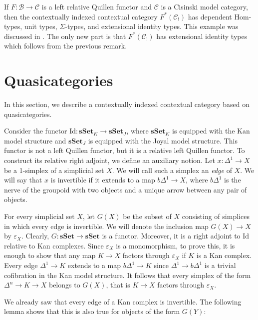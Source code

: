 \documentclass[reqno]{amsart}
\theoremstyle{definition}
\theoremstyle{remark}
\newcommand{\bDelta}{b \Delta}
\newcommand{\fs}[1]{\mathrm{#1}}
\newcommand{\cat}[1]{\mathbf{#1}}
\newcommand{\scat}[1]{\mathcal{#1}}
\newcommand{\sSet}{\cat{sSet}}
\newcommand{\Hom}{\fs{Hom}}
\newcommand{\Id}{\fs{Id}}
\numberwithin{figure}{section}
\begin{document}
\begin{example}[cisinski]
If $F : \scat{B} \to \scat{C}$ is a left relative Quillen functor and $\scat{C}$ is a Cisinski model category, then 
the contextually indexed contextual category $F^*(\scat{C}_!)$ has dependent $\Hom$-types, unit types, $\Sigma$-types, and extensional identity types.
This example was discussed in .
The only new part is that $F^*(\scat{C}_!)$ has extensional identity types which follows from the previous remark.
\end{example}

\section{Quasicategories}
\label{sec:quasicats}

In this section, we describe a contextually indexed contextual category based on quasicategories.

Consider the functor $\Id : \sSet_K \to \sSet_J$, where $\sSet_K$ is equipped with the Kan model structure and $\sSet_J$ is equipped with the Joyal model structure.
This functor is not a left Quillen functor, but it is a relative left Quillen functor.
To construct its relative right adjoint, we define an auxiliary notion.
Let $x : \Delta^1 \to X$ be a 1-simplex of a simplicial set $X$.
We will call such a simplex an \emph{edge} of $X$.
We will say that $x$ is invertible if it extends to a map $\bDelta^1 \to X$, where $\bDelta^1$ is the nerve of the groupoid with two objects and a unique arrow between any pair of objects.

For every simplicial set $X$, let $G(X)$ be the subset of $X$ consisting of simplices in which every edge is invertible.
We will denote the inclusion map $G(X) \to X$ by $\varepsilon_X$.
Clearly, $G : \sSet \to \sSet$ is a functor.
Moreover, it is a right adjoint to $\Id$ relative to Kan complexes.
Since $\varepsilon_X$ is a monomorphism, to prove this, it is enough to show that any map $K \to X$ factors through $\varepsilon_X$ if $K$ is a Kan complex.
Every edge $\Delta^1 \to K$ extends to a map $\bDelta^1 \to K$ since $\Delta^1 \to \bDelta^1$ is a trivial cofibration in the Kan model structure.
It follows that every simplex of the form $\Delta^n \to K \to X$ belongs to $G(X)$, that is $K \to X$ factors through $\varepsilon_X$.

We already saw that every edge of a Kan complex is invertible.
The following lemma shows that this is also true for objects of the form $G(Y)$:
\end{document}
